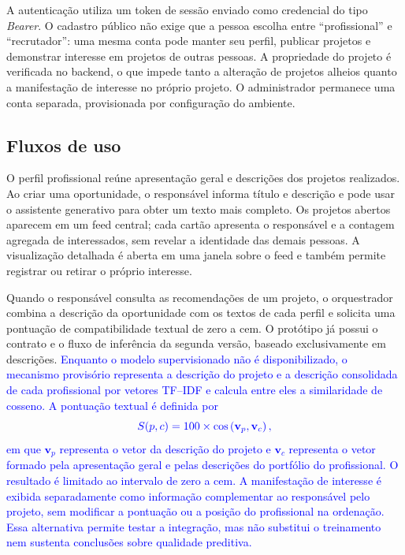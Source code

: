 \documentclass[12pt]{article}
\begin{document}
A autenticação utiliza um token de sessão enviado como credencial do tipo \textit{Bearer}. O cadastro público não exige que a pessoa escolha entre ``profissional'' e ``recrutador'': uma mesma conta pode manter seu perfil, publicar projetos e demonstrar interesse em projetos de outras pessoas. A propriedade do projeto é verificada no backend, o que impede tanto a alteração de projetos alheios quanto a manifestação de interesse no próprio projeto. O administrador permanece uma conta separada, provisionada por configuração do ambiente.

\subsection{Fluxos de uso}

O perfil profissional reúne apresentação geral e descrições dos projetos realizados. Ao criar uma oportunidade, o responsável informa título e descrição e pode usar o assistente generativo para obter um texto mais completo. Os projetos abertos aparecem em um feed central; cada cartão apresenta o responsável e a contagem agregada de interessados, sem revelar a identidade das demais pessoas. A visualização detalhada é aberta em uma janela sobre o feed e também permite registrar ou retirar o próprio interesse.

Quando o responsável consulta as recomendações de um projeto, o orquestrador combina a descrição da oportunidade com os textos de cada perfil e solicita uma pontuação de compatibilidade textual de zero a cem. O protótipo já possui o contrato e o fluxo de inferência da segunda versão, baseado exclusivamente em descrições. \textcolor{blue}{Enquanto o modelo supervisionado não é disponibilizado, o mecanismo provisório representa a descrição do projeto e a descrição consolidada de cada profissional por vetores TF--IDF e calcula entre eles a similaridade de cosseno. A pontuação textual é definida por}
\begin{equation}
\textcolor{blue}{S(p,c)=100 \times \cos\left(\mathbf{v}_{p},\mathbf{v}_{c}\right),}
\end{equation}
\textcolor{blue}{em que $\mathbf{v}_{p}$ representa o vetor da descrição do projeto e $\mathbf{v}_{c}$ representa o vetor formado pela apresentação geral e pelas descrições do portfólio do profissional. O resultado é limitado ao intervalo de zero a cem. A manifestação de interesse é exibida separadamente como informação complementar ao responsável pelo projeto, sem modificar a pontuação ou a posição do profissional na ordenação. Essa alternativa permite testar a integração, mas não substitui o treinamento nem sustenta conclusões sobre qualidade preditiva.}
\end{document}

